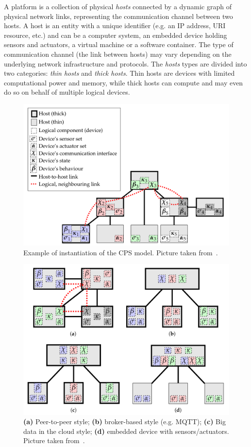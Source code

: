 A platform is a collection of physical \emph{hosts} connected by a dynamic graph of physical network links, representing the communication channel
between two hosts. A host is an entity with a unique identifier (e.g. an IP address, URI resource, etc.) and can be a computer system, an embedded
device holding sensors and actuators, a virtual machine or a software container. The type of communication channel (the link between hosts) may
vary depending on the underlying network infrastructure and protocols.
The \emph{hosts} types are divided into two categories: \emph{thin hosts} and \emph{thick hosts}. Thin hosts are devices with limited computational
power and memory, while thick hosts can compute and may even do so on behalf of multiple logical devices.

\begin{figure}
	\centering
	\includegraphics[width=0.7\linewidth]{figures/cps-example.png}
	\caption{Example of instantiation of the CPS model. Picture taken from~\cite{fi12110203}.}
	\label{fig:cps-example}
\end{figure}

\begin{figure}
	\centering
	\includegraphics[width=0.7\linewidth]{figures/notable-deployments.png}
	\caption{\textbf{(a)} Peer-to-peer style; \textbf{(b)} broker-based style (e.g. MQTT); \textbf{(c)} Big data in the cloud style; \textbf{(d)} embedded device with sensors/actuators. Picture taken from~\cite{fi12110203}.}
	\label{fig:notable-deployments}
\end{figure}

